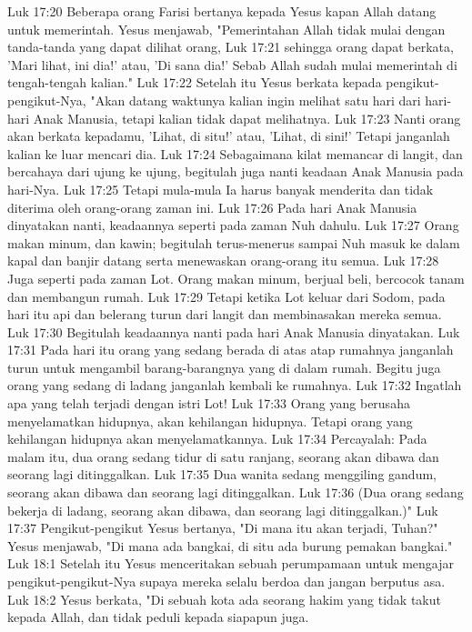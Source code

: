 Luk 17:20  Beberapa orang Farisi bertanya kepada Yesus kapan Allah datang untuk memerintah. Yesus menjawab, "Pemerintahan Allah tidak mulai dengan tanda-tanda yang dapat dilihat orang,
Luk 17:21  sehingga orang dapat berkata, 'Mari lihat, ini dia!' atau, 'Di sana dia!' Sebab Allah sudah mulai memerintah di tengah-tengah kalian."
Luk 17:22  Setelah itu Yesus berkata kepada pengikut-pengikut-Nya, "Akan datang waktunya kalian ingin melihat satu hari dari hari-hari Anak Manusia, tetapi kalian tidak dapat melihatnya.
Luk 17:23  Nanti orang akan berkata kepadamu, 'Lihat, di situ!' atau, 'Lihat, di sini!' Tetapi janganlah kalian ke luar mencari dia.
Luk 17:24  Sebagaimana kilat memancar di langit, dan bercahaya dari ujung ke ujung, begitulah juga nanti keadaan Anak Manusia pada hari-Nya.
Luk 17:25  Tetapi mula-mula Ia harus banyak menderita dan tidak diterima oleh orang-orang zaman ini.
Luk 17:26  Pada hari Anak Manusia dinyatakan nanti, keadaannya seperti pada zaman Nuh dahulu.
Luk 17:27  Orang makan minum, dan kawin; begitulah terus-menerus sampai Nuh masuk ke dalam kapal dan banjir datang serta menewaskan orang-orang itu semua.
Luk 17:28  Juga seperti pada zaman Lot. Orang makan minum, berjual beli, bercocok tanam dan membangun rumah.
Luk 17:29  Tetapi ketika Lot keluar dari Sodom, pada hari itu api dan belerang turun dari langit dan membinasakan mereka semua.
Luk 17:30  Begitulah keadaannya nanti pada hari Anak Manusia dinyatakan.
Luk 17:31  Pada hari itu orang yang sedang berada di atas atap rumahnya janganlah turun untuk mengambil barang-barangnya yang di dalam rumah. Begitu juga orang yang sedang di ladang janganlah kembali ke rumahnya.
Luk 17:32  Ingatlah apa yang telah terjadi dengan istri Lot!
Luk 17:33  Orang yang berusaha menyelamatkan hidupnya, akan kehilangan hidupnya. Tetapi orang yang kehilangan hidupnya akan menyelamatkannya.
Luk 17:34  Percayalah: Pada malam itu, dua orang sedang tidur di satu ranjang, seorang akan dibawa dan seorang lagi ditinggalkan.
Luk 17:35  Dua wanita sedang menggiling gandum, seorang akan dibawa dan seorang lagi ditinggalkan.
Luk 17:36  (Dua orang sedang bekerja di ladang, seorang akan dibawa, dan seorang lagi ditinggalkan.)"
Luk 17:37  Pengikut-pengikut Yesus bertanya, "Di mana itu akan terjadi, Tuhan?" Yesus menjawab, "Di mana ada bangkai, di situ ada burung pemakan bangkai."
Luk 18:1  Setelah itu Yesus menceritakan sebuah perumpamaan untuk mengajar pengikut-pengikut-Nya supaya mereka selalu berdoa dan jangan berputus asa.
Luk 18:2  Yesus berkata, "Di sebuah kota ada seorang hakim yang tidak takut kepada Allah, dan tidak peduli kepada siapapun juga.
